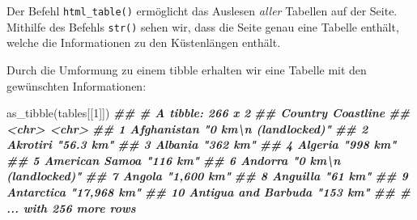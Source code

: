 \documentclass[11pt,german,a4paper]{article}
\newenvironment{Shaded}{\begin{snugshade}}{\end{snugshade}}
\newcommand{\AttributeTok}[1]{\textcolor[rgb]{0.77,0.63,0.00}{#1}}
\newcommand{\ConstantTok}[1]{\textcolor[rgb]{0.00,0.00,0.00}{#1}}
\newcommand{\DecValTok}[1]{\textcolor[rgb]{0.00,0.00,0.81}{#1}}
\newcommand{\DocumentationTok}[1]{\textcolor[rgb]{0.56,0.35,0.01}{\textbf{\textit{#1}}}}
\newcommand{\FunctionTok}[1]{\textcolor[rgb]{0.00,0.00,0.00}{#1}}
\newcommand{\NormalTok}[1]{#1}
\newcommand{\OtherTok}[1]{\textcolor[rgb]{0.56,0.35,0.01}{#1}}
\begin{document}
Der Befehl \texttt{html\_table()} ermöglicht das Auslesen \emph{aller} Tabellen auf der Seite. Mithilfe des Befehls \texttt{str()} sehen wir, dass die Seite genau eine Tabelle enthält, welche die Informationen zu den Küstenlängen enthält.

\begin{Shaded}
\end{Shaded}

Durch die Umformung zu einem tibble erhalten wir eine Tabelle mit den gewünschten Informationen:

\begin{Shaded}
\begin{Highlighting}[]
\FunctionTok{as\_tibble}\NormalTok{(tables[[}\DecValTok{1}\NormalTok{]])}
\DocumentationTok{\#\# \# A tibble: 266 x 2}
\DocumentationTok{\#\#    Country             Coastline                     }
\DocumentationTok{\#\#    \textless{}chr\textgreater{}               \textless{}chr\textgreater{}                         }
\DocumentationTok{\#\#  1 Afghanistan         "0 km\textbackslash{}n          (landlocked)"}
\DocumentationTok{\#\#  2 Akrotiri            "56.3 km"                     }
\DocumentationTok{\#\#  3 Albania             "362 km"                      }
\DocumentationTok{\#\#  4 Algeria             "998 km"                      }
\DocumentationTok{\#\#  5 American Samoa      "116 km"                      }
\DocumentationTok{\#\#  6 Andorra             "0 km\textbackslash{}n          (landlocked)"}
\DocumentationTok{\#\#  7 Angola              "1,600 km"                    }
\DocumentationTok{\#\#  8 Anguilla            "61 km"                       }
\DocumentationTok{\#\#  9 Antarctica          "17,968 km"                   }
\DocumentationTok{\#\# 10 Antigua and Barbuda "153 km"                      }
\DocumentationTok{\#\# \# ... with 256 more rows}
\end{Highlighting}
\end{Shaded}
\end{document}
